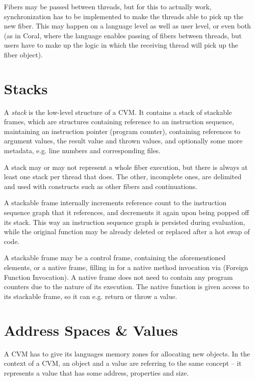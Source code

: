Fibers may be passed between threads, but for this to actually work, synchronization has to be implemented to make the threads able to pick up the new fiber. This may happen on a language level as well as user level, or even both (as in Coral, where the language enables passing of fibers between threads, but users have to make up the logic in which the receiving thread will pick up the fiber object). 





\section{Stacks}

A {\em stack} is the low-level structure of a CVM. It contains a stack of stackable frames, which are structures containing reference to an instruction sequence, maintaining an instruction pointer (program counter), containing references to argument values, the result value and thrown values, and optionally some more metadata, e.g. line numbers and corresponding files. 

A stack may or may not represent a whole fiber execution, but there is always at least one stack per thread that does. The other, incomplete ones, are delimited and used with constructs such as other fibers and continuations. 

A stackable frame internally increments reference count to the instruction sequence graph that it references, and decrements it again upon being popped off its stack. This way an instruction sequence graph is persisted during evaluation, while the original function may be already deleted or replaced after a hot swap of code. 

A stackable frame may be a control frame, containing the aforementioned elements, or a native frame, filling in for a native method invocation via  (Foreign Function Invocation). A native frame does not need to contain any program counters due to the nature of its execution. The native function is given access to its stackable frame, so it can e.g. return or throw a value. 






\section{Address Spaces \& Values}

A CVM has to give its languages memory zones for allocating new objects. In the context of a CVM, an object and a value are referring to the same concept -- it represents a value that has some address, properties and size. 

